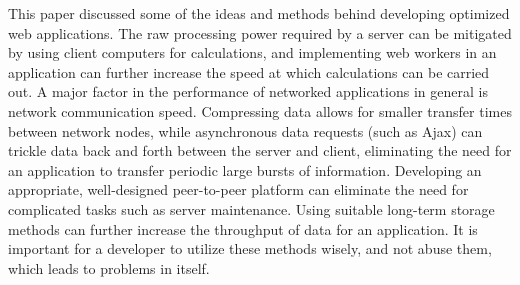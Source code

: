 \documentclass{acmsmall}
\begin{document}
This paper discussed some of the ideas and methods behind developing optimized web applications.  The raw processing power required by a server can be mitigated by using client computers for calculations, and implementing web workers in an application can further increase the speed at which calculations can be carried out.  A major factor in the performance of networked applications in general is network communication speed.  Compressing data allows for smaller transfer times between network nodes, while asynchronous data requests (such as Ajax) can trickle data back and forth between the server and client, eliminating the need for an application to transfer periodic large bursts of information.  Developing an appropriate, well-designed peer-to-peer platform can eliminate the need for complicated tasks such as server maintenance.  Using suitable long-term storage methods can further increase the throughput of data for an application.  It is important for a developer to utilize these methods wisely, and not abuse them, which leads to problems in itself.




\end{document}
